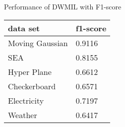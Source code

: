 
\begin{frame}{Performance of DWMIL with F1-score}

\begin{table}[h]
    \centering
    \begin{tabular}{ | l | l | }
    \hline
    data set & f1-score \\ \hline \hline
    Moving Gaussian & 0.9116 \\ \hline
    SEA & 0.8155 \\ \hline
    Hyper Plane & 0.6612 \\ \hline
    Checkerboard & 0.6571 \\ \hline
    Electricity & 0.7197 \\ \hline
    Weather & 0.6417 \\ \hline
    \end{tabular}
\end{table}

\end{frame}

